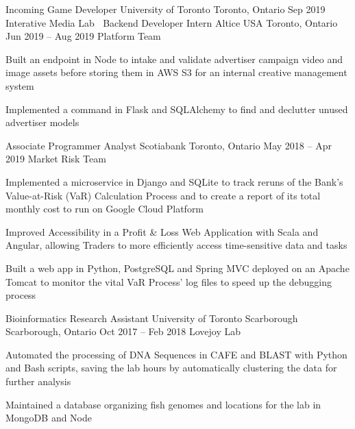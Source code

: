 \begin{cventries}
  \cventry
    {Incoming Game Developer}
    {University of Toronto}
    {Toronto, Ontario}
    {Sep 2019}
    {Interative Media Lab}
    {
      $\:$
    }
  \cventry
    {Backend Developer Intern}
    {Altice USA}
    {Toronto, Ontario}
    {Jun 2019 -- Aug 2019}
    {Platform Team}
    {
    \begin{cvitems}
      \item {Built an endpoint in Node to intake and validate advertiser campaign video and image assets before storing them in AWS S3 for an internal creative management system}
      \item {Implemented a command in Flask and SQLAlchemy to find and declutter unused advertiser models}
    \end{cvitems}
    }
  \cventry
    {Associate Programmer Analyst}
    {Scotiabank}
    {Toronto, Ontario}
    {May 2018 -- Apr 2019}
    {Market Risk Team}
    {
      \begin{cvitems}
        \item {Implemented a microservice in Django and SQLite to track reruns of the Bank's Value-at-Risk (VaR) Calculation Process and to create a report of its total monthly cost to run on Google Cloud Platform}
        \item {Improved Accessibility in a Profit \& Loss Web Application with Scala and Angular, allowing Traders to more efficiently access time-sensitive data and tasks}
        \item {Built a web app in Python, PostgreSQL and Spring MVC deployed on an Apache Tomcat to monitor the vital VaR Process' log files to speed up the debugging process}
      \end{cvitems}
    }

  \cventry
    {Bioinformatics Research Assistant}
    {University of Toronto Scarborough}
    {Scarborough, Ontario}
    {Oct 2017 -- Feb 2018}
    {Lovejoy Lab}
    {
      \begin{cvitems}
        \item {Automated the processing of DNA Sequences in CAFE and BLAST with Python and Bash scripts, saving the lab hours by automatically clustering the data for further analysis}
        \item {Maintained a database organizing fish genomes and locations for the lab in MongoDB and Node}
      \end{cvitems}
    }
\end{cventries}
